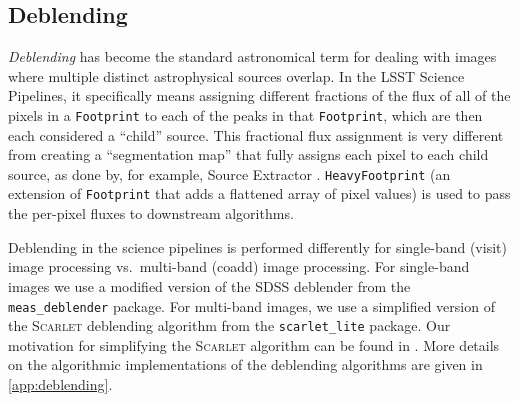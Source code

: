 \subsection{Deblending}

\label{sec:deblending}

\emph{Deblending} has become the standard astronomical term for dealing with images where multiple distinct astrophysical sources overlap.
In the LSST Science Pipelines, it specifically means assigning different fractions of the flux of all of the pixels in a \texttt{Footprint} to each of the peaks in that \texttt{Footprint}, which are then each considered a ``child'' source.
This fractional flux assignment is very different from creating a ``segmentation map'' that fully assigns each pixel to each child source, as done by, for example, Source Extractor \citep{1996A&AS..117..393B}.
\texttt{HeavyFootprint} (an extension of \texttt{Footprint} that adds a flattened array of pixel values) is used to pass the per-pixel fluxes to downstream algorithms.

Deblending in the science pipelines is performed differently for single-band (visit) image processing vs.\ multi-band (coadd) image processing.
For single-band images we use a modified version of the SDSS deblender \citep{rhldeblend} from the \texttt{meas\_deblender} package.
For multi-band images, we use a simplified version of the \textsc{Scarlet} deblending algorithm \citep{2018A&C....24..129M} from the \texttt{scarlet\_lite} package.
Our motivation for simplifying the \textsc{Scarlet} algorithm can be found in \citet{DMTN-194}.
More details on the algorithmic implementations of the deblending algorithms are given in \ref{app:deblending}.
